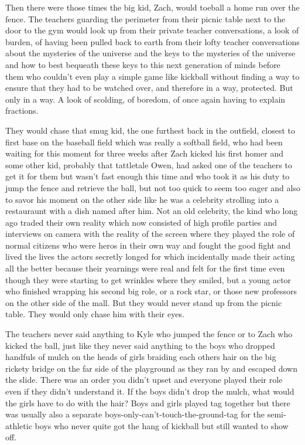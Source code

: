 Then there were those times the big kid, Zach, would toeball a home run over the fence. The teachers guarding the perimeter from their picnic table next to the door to the gym would look up from their private teacher conversations, a look of burden, of having been pulled back to earth from their lofty teacher conversations about the mysteries of the universe and the keys to the mysteries of the universe and how to best bequeath these keys to this next generation of minds before them who couldn't even play a simple game like kickball without finding a way to ensure that they had to be watched over, and therefore in a way, protected. But only in a way. A look of scolding, of boredom, of once again having to explain fractions.

  They would chase that smug kid, the one furthest back in the outfield, closest to first base on the baseball field which was really a softball field, who had been waiting for this moment for three weeks after Zach kicked his first homer and some other kid, probably that tattletale Owen, had asked one of the teachers to get it for them but wasn't fast enough this time and who took it as his duty to jump the fence and retrieve the ball, but not too quick to seem too eager and also to savor his moment on the other side like he was a celebrity strolling into a restauraunt with a dish named after him. Not an old celebrity, the kind who long ago traded their own reality which now consisted of high profile parties and interviews on camera with the reality of the screen where they played the role of normal citizens who were heros in their own way and fought the good fight and lived the lives the actors secretly longed for which incidentally made their acting all the better because their yearnings were real and felt for the first time even though they were starting to get wrinkles where they smiled, but a young actor who finished wrapping his second big role, or a rock star, or those new professors on the other side of the mall. But they would never stand up from the picnic table. They would only chase him with their eyes.

  The teachers never said anything to Kyle who jumped the fence or to Zach who kicked the ball, just like they never said anything to the boys who dropped handfuls of mulch on the heads of girls braiding each others hair on the big rickety bridge on the far side of the playground as they ran by and escaped down the slide. There was an order you didn't upset and everyone played their role even if they didn't understand it. If the boys didn't drop the mulch, what would the girls have to do with the hair? Boys and girls played tag together but there was usually also a separate boys-only-can't-touch-the-ground-tag for the semi-athletic boys who never quite got the hang of kickball but still wanted to show off. 

